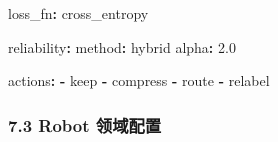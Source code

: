 \documentclass[
  12pt,
]{ctexart}
\newenvironment{Shaded}{}{}
\newcommand{\AttributeTok}[1]{\textcolor[rgb]{0.49,0.56,0.16}{#1}}
\newcommand{\FloatTok}[1]{\textcolor[rgb]{0.25,0.63,0.44}{#1}}
\newcommand{\FunctionTok}[1]{\textcolor[rgb]{0.02,0.16,0.49}{#1}}
\newcommand{\KeywordTok}[1]{\textcolor[rgb]{0.00,0.44,0.13}{\textbf{#1}}}
\begin{document}
\begin{Shaded}
\begin{Highlighting}[]
\FunctionTok{loss\_fn}\KeywordTok{:}\AttributeTok{ cross\_entropy}

\FunctionTok{reliability}\KeywordTok{:}
\AttributeTok{  }\FunctionTok{method}\KeywordTok{:}\AttributeTok{ hybrid}
\AttributeTok{  }\FunctionTok{alpha}\KeywordTok{:}\AttributeTok{ }\FloatTok{2.0}

\FunctionTok{actions}\KeywordTok{:}
\AttributeTok{  }\KeywordTok{{-}}\AttributeTok{ keep}
\AttributeTok{  }\KeywordTok{{-}}\AttributeTok{ compress}
\AttributeTok{  }\KeywordTok{{-}}\AttributeTok{ route}
\AttributeTok{  }\KeywordTok{{-}}\AttributeTok{ relabel}
\end{Highlighting}
\end{Shaded}

\subsubsection{7.3 Robot 领域配置}\label{robot-ux9886ux57dfux914dux7f6e}
\end{document}
